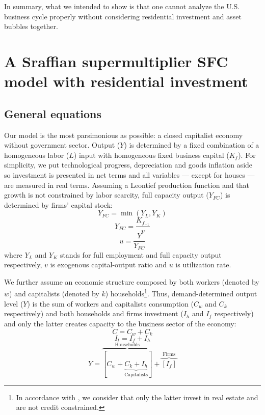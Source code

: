 \documentclass[11pt]{article}
\begin{document}
In summary, what we intended to show is that one cannot analyze the U.S. business cycle properly without considering residential investment and asset bubbles together.


\section{A Sraffian supermultiplier SFC model with residential investment}
\label{sec:orgdb0d305}
\label{sec:Model}
\subsection{General equations}
\label{sec:org974e94e}

Our model is the most parsimonious as possible: a closed capitalist economy without government sector. Output (\(Y\)) is determined by  a fixed combination of a homogeneous labor (\(L\)) input with homogeneous fixed business capital (\(K_f\)). 
For simplicity, we put technological progress, depreciation and goods inflation aside so investment is presented in net terms and all variables --- except for houses --- are measured in real terms.
Assuming a Leontief production function and that growth is not constrained by labor scarcity, full capacity output (\(Y_{FC}\)) is
determined by firms' capital stock:
\begin{equation}
\label{_Leontieff}
    Y_{FC} = \min (Y_L, Y_K)
\end{equation}
\begin{equation}
\label{_YFC}
    Y_{FC} = \frac{K_{f_{-1}}}{v}
\end{equation}
\begin{equation}
\label{_u}
    u = \frac{Y}{Y_{FC}}
\end{equation}
where \(Y_L\) and \(Y_K\) stands for full employment and full capacity output respectively, \(v\) is exogenous capital-output ratio and \(u\) is utilization rate.

We further assume an economic structure composed by both workers (denoted by \(w\)) and capitalists (denoted by \(k\)) households\footnote{In accordance with \textcite{albanesi_credit_2017}, we consider that only the latter invest in real estate and are not credit constrained.}.
Thus, demand-determined output level (\(Y\))  is the sum of workers and capitalists consumption (\(C_w\) and \(C_k\) respectively) and both households and firms investment (\(I_h\) and \(I_f\) respectively) and only the latter creates capacity to the business sector of the economy:
\begin{equation}
\label{_Ct}
    C = C_w + C_k
\end{equation}
\begin{equation}
\label{_It}
    I_t = I_f + I_h
\end{equation}
\begin{equation}
\label{_Y}
    Y = \overbrace{[C_w + \underbrace{C_k + I_h}_{\text{Capitalists}}]}^{\text{Households}} + \overbrace{[I_f]}^{\text{Firms}}
\end{equation}
\end{document}

